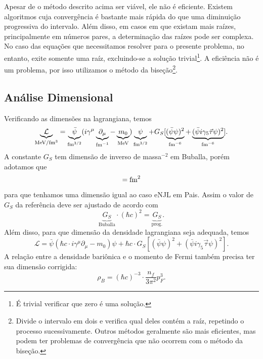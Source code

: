 Apesar de o método descrito acima ser viável, ele não é eficiente. Existem algoritmos cuja convergência é bastante mais rápida do que uma diminuição progressiva do intervalo. Além disso, em casos em que existam mais raízes, principalmente em números pares, a determinação das raízes pode ser complexa. No caso das equações que necessitamos resolver para o presente problema, no entanto, exite somente uma raíz, excluindo-se a solução trivial\footnote{É trivial verificar que zero é uma solução.}. A eficiência não é um problema, por isso utilizamos o método da biseção\footnote{Divide o intervalo em dois e verifica qual deles contém a raíz, repetindo o processo sucessivamente. Outros métodos geralmente são mais eficientes, mas podem ter problemas de convergência que não ocorrem com o método da biseção.}.

\subsection{Análise Dimensional}

Verificando as dimensões na lagrangiana, temos
\begin{equation}
	\underbrace{\mathcal{L}}_{\mathcal{\rm{MeV}/\rm{fm}^3}} = \underbrace{\bar{\psi}}_{\rm{fm}^{3/2}}(i\gamma^\mu\underbrace{\partial_\mu}_{\rm{fm}^{-1}} - \underbrace{m_0}_{\rm{MeV}})\underbrace{\psi}_{\rm{fm}^{3/2}} + G_S [ \underbrace{(\bar{\psi}\psi)^2}_{\rm{fm}^{-6}} + \underbrace{(\bar{\psi}i\gamma_5\vec{\tau}\psi)^2}_{\rm{fm}^{-6}}].
\end{equation}
%
A constante $G_S$ tem dimensão de inverso de massa$^{-2}$ em Buballa\cite{Buballa1996}, porém adotamos que 
\begin{equation}
	[G_S] = \rm{fm}^{2}
\end{equation}
%
para que tenhamos uma dimensão igual ao caso eNJL em Pais\cite{Pais}. Assim o valor de $G_S$ da referência deve ser ajustado de acordo com
\begin{equation}
	\underbrace{G_S}_{\textrm{Buballa}} \cdot (\hbar c)^2 = \underbrace{G_S}_{\textrm{prog.}}.
\end{equation}
%
Além disso, para que dimensão da densidade lagrangiana seja adequada, temos
\begin{equation}
	\mathcal{L} = \bar{\psi}(\hbar c \cdot i\gamma^\mu\partial_\mu - m_0)\psi + \hbar c \cdot G_S[(\bar{\psi}\psi)^2 + (\bar{\psi}i\gamma_5\vec{\tau}\psi)^2].
\end{equation}
%
A relação entre a densidade bariônica e o momento de Fermi também precisa ter sua dimensão corrigida:
\begin{equation}
	\rho_B = (\hbar c)^{-3} \cdot \frac{n_f}{3\pi^2}p_F^3.
\end{equation}

